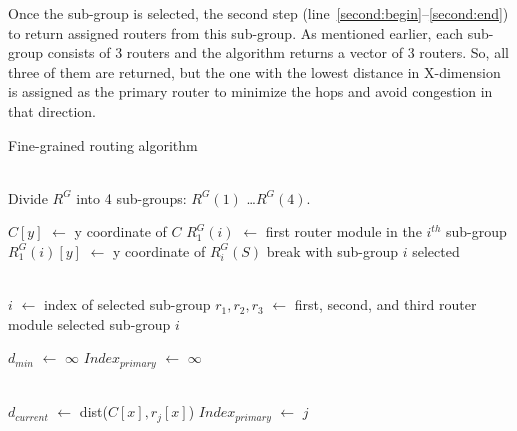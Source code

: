 Once the sub-group is selected, the second step (line~\ref{second:begin}--\ref{second:end}) to return assigned routers from this sub-group.
As mentioned earlier, each sub-group consists of 3 routers and the algorithm returns a vector of 3 routers. So, all three of them are 
returned, but the one with the lowest distance in X-dimension is assigned as the primary router to minimize the hops and avoid congestion 
in that direction. 


\begin{algorithm}
\caption{Fine-grained routing algorithm}
\label{alg:fgr}
\begin{algorithmic}[1]
 \\ 
\State Divide $R^G$ into 4 sub-groups: $R^G(1)$ \ldots $R^G(4)$.

 
\label{first:begin}
    \State $C[y]$ $\leftarrow$ y coordinate of $C$
    \State $R^G_{1}(i)$ $\leftarrow$ first router module in the $i^{th}$ sub-group
    \State $R^G_{1}(i)[y]$ $\leftarrow$ y coordinate of $R^G_{i}(S)$
    \State break with sub-group $i$ selected
    \EndIf
\EndFor
\label{first:end}

\\ 

\State $i$ $\leftarrow$ index of selected sub-group
\label{second:begin}
\State $r_1, r_2, r_3$ $\leftarrow$ first, second, and third router module 
\State \hspace{\algorithmicindent} selected sub-group $i$

\State $d_{min}$ $\leftarrow$ $\infty$ 
\State $Index_{primary}$ $\leftarrow$ $\infty$

\\

    \State $d_{current}$ $\leftarrow$ dist($C[x], r_j[x]$) 
        \State $Index_{primary}$ $\leftarrow$ $j$
        \EndIf


\end{algorithmic}
\end{algorithm}
